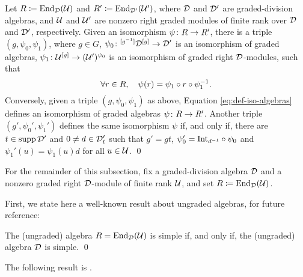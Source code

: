 \begin{thm}\label{thm:iso-abstract}
	Let $R \coloneqq \operatorname{End}_{\mathcal{D}}(\mathcal U)$ and $R' \coloneqq \operatorname{End}_{\mathcal{D}'}(\mathcal U')$, where $\mathcal{D}$ and $\mathcal{D}'$ are graded-division algebras, and $\mathcal U$ and $\mathcal U'$ are nonzero right graded modules of finite rank over $\mathcal{D}$ and $\mathcal{D}'$, respectively.
	Given an isomorphism $\psi\colon R \to R'$, there is a triple $(g, \psi_0, \psi_1)$, where $g \in G$, $\psi_0\colon {}^{[g^{-1}]}\mathcal{D}^{[g]} \to \mathcal{D}'$ is an isomorphism of graded algebras, $\psi_1\colon \mathcal U^{[g]} \to (\mathcal U')^{\psi_0}$ is an isomorphism of graded right $\mathcal{D}$-modules, such that
	\begin{equation}\label{eq:def-iso-algebras}
		\forall r\in R, \quad \psi(r) = \psi_1 \circ r \circ \psi_1^{-1}.
	\end{equation}
	Conversely, given a triple $(g, \psi_0, \psi_1)$ as above, Equation \eqref{eq:def-iso-algebras} defines an isomorphism of graded algebras $\psi\colon R \to R'$.
	Another triple $(g', \psi_0', \psi_1')$ defines the same isomorphism $\psi$ if, and only if, there are $t\in \operatorname{supp} \mathcal{D}'$ and $0 \neq d\in \mathcal{D}'_t$ such that $g'= gt$, $\psi_0' = \mathrm{Int}_{d^{-1}} \circ \psi_0$ and $\psi_1' (u) = \psi_1 (u) d$ for all $u \in \mathcal U$. \qed
\end{thm}

For the remainder of this subsection, fix a graded-division algebra $\mathcal{D}$ and a nonzero graded right $\mathcal{D}$-module of finite rank $\mathcal U$, and set $R \coloneqq \operatorname{End}_{\mathcal{D}} (\mathcal U)$. 

First, we state here a well-known result about ungraded algebras, for future reference:

\begin{prop}\label{prop:R-simple-iff-D-simple}
	The (ungraded) algebra $R = \operatorname{End}_{\mathcal{D}} (\mathcal U)$ is simple if, and only if, the (ungraded) algebra $\mathcal{D}$ is simple. \qed
\end{prop}


The following result is \cite[Exercise 3 on page 60]{livromicha}.

